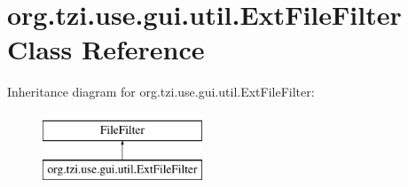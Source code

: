 \hypertarget{classorg_1_1tzi_1_1use_1_1gui_1_1util_1_1_ext_file_filter}{\section{org.\-tzi.\-use.\-gui.\-util.\-Ext\-File\-Filter Class Reference}
\label{classorg_1_1tzi_1_1use_1_1gui_1_1util_1_1_ext_file_filter}
}
Inheritance diagram for org.\-tzi.\-use.\-gui.\-util.\-Ext\-File\-Filter\-:\begin{figure}[H]
\begin{center}
\leavevmode
\includegraphics[height=2.000000cm]{classorg_1_1tzi_1_1use_1_1gui_1_1util_1_1_ext_file_filter}
\end{center}
\end{figure}
